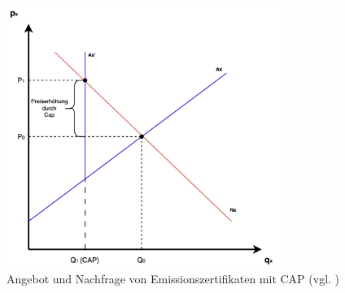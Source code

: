 \begin{figure}[ht]
	\centering
	\includegraphics[width=0.8\textwidth]{Bilder/supply_demand_ets.png} 
	\caption{Angebot und Nachfrage von Emissionszertifikaten mit CAP (vgl. \cite{pettinger.2017})}
	\label{fig:supply_demand_ets}
\end{figure}